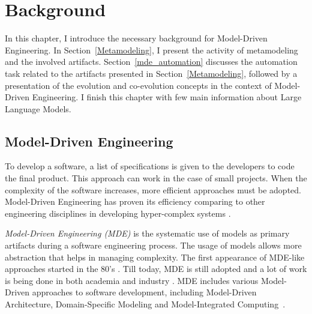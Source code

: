 \clearemptydoublepage
\chapter{Background}
\label{background}

In this chapter, I introduce the necessary background for Model-Driven Engineering. In Section~\ref{Metamodeling}, I present the activity of metamodeling and the involved artifacts. Section~\ref{mde_automation} discusses the automation task related to the artifacts presented in Section~\ref{Metamodeling}, followed by a presentation of the evolution and co-evolution concepts in the context of Model-Driven Engineering. I finish this chapter with few main information about Large Language Models.

\section{Model-Driven Engineering}
\label{mde}
To develop a software, a list of specifications is given to the developers to code the final product. This approach can work in the case of small projects. When the complexity of the software increases, more efficient approaches must be adopted. Model-Driven Engineering has proven its efficiency comparing to other engineering disciplines in developing hyper-complex systems \cite{1231146}.

\textit{Model-Driven Engineering (MDE)} is the systematic use of models as primary artifacts during a software engineering process. The usage of models allows more abstraction that helps in managing complexity. The first appearance of MDE-like approaches started in the 80's \cite{10.1007/s10270-005-0079-0}. Till today, MDE is still adopted  and a lot of work is being done in both academia and industry \cite{Mohagheghi2009,mohagheghi2008proof,jongeling2022Structural,wortmann2020modeling}. MDE includes various Model-Driven approaches to software development, including Model-Driven Architecture, Domain-Specific Modeling and Model-Integrated Computing~\cite{10.1145/1985793.1985882}. 



